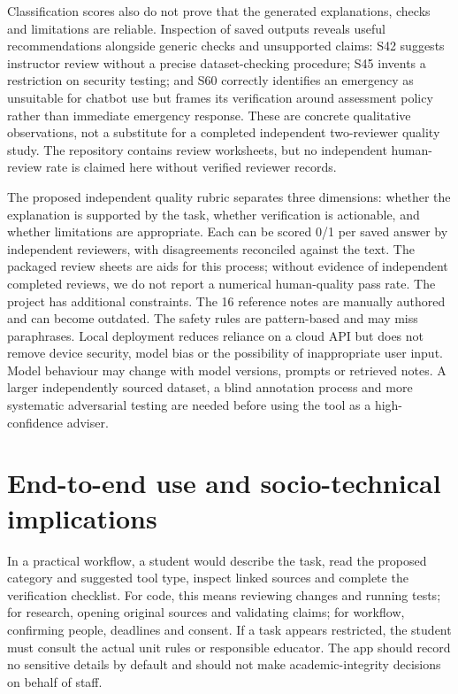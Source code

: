 \documentclass[11pt,a4paper]{article}
\begin{document}
Classification scores also do not prove that the generated explanations, checks and limitations are reliable. Inspection of saved outputs reveals useful recommendations alongside generic checks and unsupported claims: S42 suggests instructor review without a precise dataset-checking procedure; S45 invents a restriction on security testing; and S60 correctly identifies an emergency as unsuitable for chatbot use but frames its verification around assessment policy rather than immediate emergency response. These are concrete qualitative observations, not a substitute for a completed independent two-reviewer quality study. The repository contains review worksheets, but no independent human-review rate is claimed here without verified reviewer records.

The proposed independent quality rubric separates three dimensions: whether the explanation is supported by the task, whether verification is actionable, and whether limitations are appropriate. Each can be scored 0/1 per saved answer by independent reviewers, with disagreements reconciled against the text. The packaged review sheets are aids for this process; without evidence of independent completed reviews, we do not report a numerical human-quality pass rate. The project has additional constraints. The 16 reference notes are manually authored and can become outdated. The safety rules are pattern-based and may miss paraphrases. Local deployment reduces reliance on a cloud API but does not remove device security, model bias or the possibility of inappropriate user input. Model behaviour may change with model versions, prompts or retrieved notes. A larger independently sourced dataset, a blind annotation process and more systematic adversarial testing are needed before using the tool as a high-confidence adviser.

\section{End-to-end use and socio-technical implications}
In a practical workflow, a student would describe the task, read the proposed category and suggested tool type, inspect linked sources and complete the verification checklist. For code, this means reviewing changes and running tests; for research, opening original sources and validating claims; for workflow, confirming people, deadlines and consent. If a task appears restricted, the student must consult the actual unit rules or responsible educator. The app should record no sensitive details by default and should not make academic-integrity decisions on behalf of staff.
\end{document}
